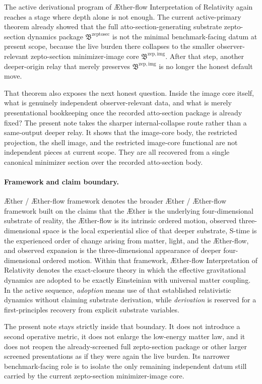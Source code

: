 \documentclass[11pt]{article}
\newcommand{\Aether}{\AE{}ther}
\newcommand{\Aflow}{\AE{}ther-flow}
\newcommand{\TheoryName}{\Aflow{} Interpretation of Relativity}
\newcommand{\TheoryProgram}{\Aether{} / \Aflow{} framework}
\newcommand{\ZeptoSectionPackage}{\mathfrak B^{\mathrm{zeptosec}}}
\newcommand{\ZeptoImageCore}{\mathfrak B^{\mathrm{zep,img}}}
\begin{document}
The active derivational program of \TheoryName{} again reaches a stage where depth alone is not enough. The current active-primary theorem already showed that the full atto-section-generating substrate zepto-section dynamics package \(\ZeptoSectionPackage\) is not the minimal benchmark-facing datum at present scope, because the live burden there collapses to the smaller observer-relevant zepto-section minimizer-image core \(\ZeptoImageCore\). After that step, another deeper-origin relay that merely preserves \(\ZeptoImageCore\) is no longer the honest default move.

That theorem also exposes the next honest question. Inside the image core itself, what is genuinely independent observer-relevant data, and what is merely presentational bookkeeping once the recorded atto-section package is already fixed? The present note takes the sharper internal-collapse route rather than a same-output deeper relay. It shows that the image-core body, the restricted projection, the shell image, and the restricted image-core functional are not independent pieces at current scope. They are all recovered from a single canonical minimizer section over the recorded atto-section body.

\paragraph{Framework and claim boundary.}
\TheoryProgram{} denotes the broader \Aether{} / \Aflow{} framework built on the claims that the \Aether{} is the underlying four-dimensional substrate of reality, the \Aflow{} is its intrinsic ordered motion, observed three-dimensional space is the local experiential slice of that deeper substrate, S-time is the experienced order of change arising from matter, light, and the \Aflow{}, and observed expansion is the three-dimensional appearance of deeper four-dimensional ordered motion. Within that framework, \TheoryName{} denotes the exact-closure theory in which the effective gravitational dynamics are adopted to be exactly Einsteinian with universal matter coupling. In the active sequence, \emph{adoption} means use of that established relativistic dynamics without claiming substrate derivation, while \emph{derivation} is reserved for a first-principles recovery from explicit substrate variables.

The present note stays strictly inside that boundary. It does not introduce a second operative metric, it does not enlarge the low-energy matter law, and it does not reopen the already-screened full zepto-section package or other larger screened presentations as if they were again the live burden. Its narrower benchmark-facing role is to isolate the only remaining independent datum still carried by the current zepto-section minimizer-image core.
\end{document}
